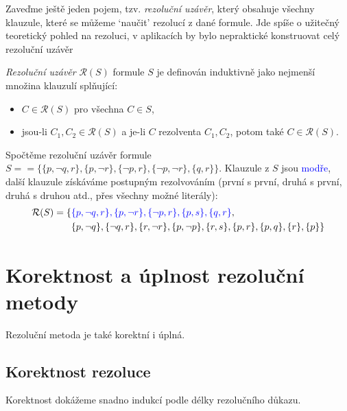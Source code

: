 Zaveďme ještě jeden pojem, tzv. \emph{rezoluční uzávěr}, který obsahuje všechny klauzule, které se můžeme `naučit' rezolucí z dané formule. Jde spíše o užitečný teoretický pohled na rezoluci, v aplikacích by bylo nepraktické konstruovat celý rezoluční uzávěr

\begin{definition}
\emph{Rezoluční uzávěr} $\mathcal R(S)$ formule $S$ je definován induktivně jako nejmenší množina klauzulí splňující:
\begin{itemize}
    \item $C\in\mathcal R(S)$ pro všechna $C\in S$,
    \item jsou-li $C_1,C_2\in\mathcal R(S)$ a je-li $C$ rezolventa $C_1,C_2$, potom také $C\in\mathcal R(S)$.
\end{itemize}
\end{definition}

\begin{example}
    Spočtěme rezoluční uzávěr formule $S==\{\{p,\neg q,r\},\{p,\neg r\},\{\neg p,r\},\{\neg p,\neg r\},\{q,r\}\}$. Klauzule z $S$ jsou \textcolor{blue}{modře}, další klauzule získáváme postupným rezolvováním (první s první, druhá s první, druhá s druhou atd., přes všechny možné literály):
    \begin{align*}
        \mathcal R(S)=\{&\textcolor{blue}{\{p,\neg q,r\},\{p,\neg r\},\{\neg p,r\},\{p,s\},\{q,r\}},\\&\{p,\neg q\},\{\neg q,r\},\{r,\neg r\},\{p,\neg p\},\{r,s\},\{p,r\},\{p,q\},\{r\},\{p\}\}
    \end{align*}
\end{example}

\section{Korektnost a úplnost rezoluční metody}

Rezoluční metoda je také korektní i úplná. 

\subsection{Korektnost rezoluce}

Korektnost dokážeme snadno indukcí podle délky rezolučního důkazu.

